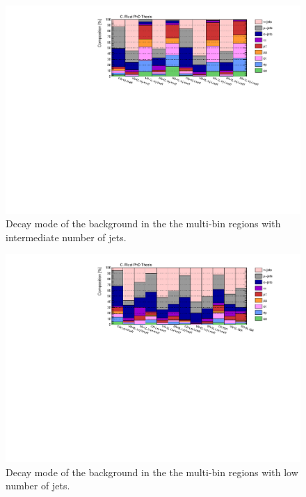 \begin{figure}[htbp]
\includegraphics[width=\textwidth]{figures/strong_prod/comp_plots/Inj_tt.pdf}
\caption{Decay mode of the \ttbar background in the the multi-bin regions with intermediate number of jets.}
	\label{fig:ttcomp_Inj}
\end{figure}

\begin{figure}[htbp]
\includegraphics[width=\textwidth]{figures/strong_prod/comp_plots/Lnj_tt.pdf}
\caption{Decay mode of the \ttbar background in the the multi-bin regions with low number of jets.}
	\label{fig:ttcomp_Lnj}
\end{figure}



